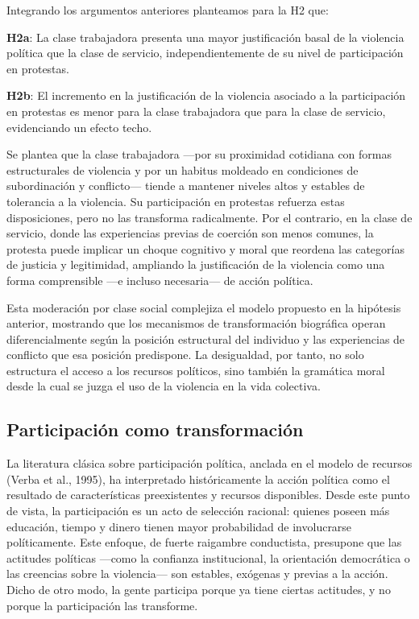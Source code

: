 \documentclass[
  13pt,
]{article}
\begin{document}
Integrando los argumentos anteriores planteamos para la H2 que:

\textbf{H2a}: La clase trabajadora presenta una mayor justificación
basal de la violencia política que la clase de servicio,
independientemente de su nivel de participación en protestas.

\textbf{H2b}: El incremento en la justificación de la violencia asociado
a la participación en protestas es menor para la clase trabajadora que
para la clase de servicio, evidenciando un efecto techo.

Se plantea que la clase trabajadora ---por su proximidad cotidiana con
formas estructurales de violencia y por un habitus moldeado en
condiciones de subordinación y conflicto--- tiende a mantener niveles
altos y estables de tolerancia a la violencia. Su participación en
protestas refuerza estas disposiciones, pero no las transforma
radicalmente. Por el contrario, en la clase de servicio, donde las
experiencias previas de coerción son menos comunes, la protesta puede
implicar un choque cognitivo y moral que reordena las categorías de
justicia y legitimidad, ampliando la justificación de la violencia como
una forma comprensible ---e incluso necesaria--- de acción política.

Esta moderación por clase social complejiza el modelo propuesto en la
hipótesis anterior, mostrando que los mecanismos de transformación
biográfica operan diferencialmente según la posición estructural del
individuo y las experiencias de conflicto que esa posición predispone.
La desigualdad, por tanto, no solo estructura el acceso a los recursos
políticos, sino también la gramática moral desde la cual se juzga el uso
de la violencia en la vida colectiva.

\subsection{Participación como
transformación}\label{participaciuxf3n-como-transformaciuxf3n}

La literatura clásica sobre participación política, anclada en el modelo
de recursos (Verba et al., 1995), ha interpretado históricamente la
acción política como el resultado de características preexistentes y
recursos disponibles. Desde este punto de vista, la participación es un
acto de selección racional: quienes poseen más educación, tiempo y
dinero tienen mayor probabilidad de involucrarse políticamente. Este
enfoque, de fuerte raigambre conductista, presupone que las actitudes
políticas ---como la confianza institucional, la orientación democrática
o las creencias sobre la violencia--- son estables, exógenas y previas a
la acción. Dicho de otro modo, la gente participa porque ya tiene
ciertas actitudes, y no porque la participación las transforme.
\end{document}
